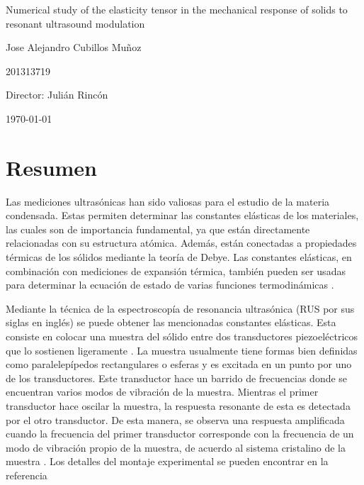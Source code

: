 \documentclass[12pt]{article}
\begin{document}
\begin{center}
\Huge
Numerical study of the elasticity tensor in the mechanical response of solids to resonant ultrasound modulation

\vspace{3mm}
\Large Jose Alejandro Cubillos Muñoz

\large
201313719


\vspace{2mm}
\Large
Director: Julián Rincón

\normalsize
\vspace{2mm}

\today
\end{center}


\normalsize

\section{Resumen}

Las mediciones ultrasónicas han sido valiosas para el estudio de la materia condensada. Estas permiten determinar las constantes elásticas de los materiales, las cuales son de importancia fundamental, ya que están directamente relacionadas con su estructura atómica. Además, están conectadas a propiedades térmicas de los sólidos mediante la teoría de Debye. Las constantes elásticas, en combinación con mediciones de expansión térmica, también pueden ser usadas para determinar la ecuación de estado de varias funciones termodinámicas \cite{Leisure_1997}.


Mediante la técnica de la espectroscopía de resonancia ultrasónica (RUS por sus siglas en inglés) se puede obtener las mencionadas constantes elásticas. Esta consiste en colocar una muestra del sólido entre dos transductores piezoeléctricos que lo sostienen ligeramente \cite{MIGLIORI19931}. La muestra usualmente tiene formas bien definidas como paralelepípedos rectangulares o esferas y es excitada en un punto por uno de los transductores. Este transductor hace un barrido de frecuencias donde se encuentran varios modos de vibración de la muestra. Mientras el primer transductor hace oscilar la muestra, la respuesta resonante de esta es detectada por el otro transductor. De esta manera, se observa una respuesta amplificada cuando la frecuencia del primer transductor corresponde con la frecuencia de un modo de vibración propio de la muestra, de acuerdo al sistema cristalino de la muestra \cite{Leisure_1997}. Los detalles del montaje experimental se pueden encontrar en la referencia \cite{MIGLIORI19931}
\end{document}
